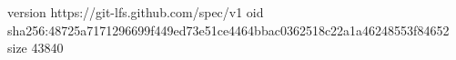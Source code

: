 version https://git-lfs.github.com/spec/v1
oid sha256:48725a7171296699f449ed73e51ce4464bbac0362518c22a1a46248553f84652
size 43840
